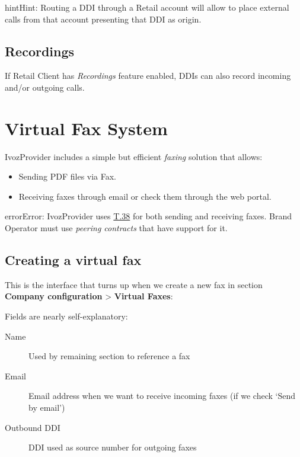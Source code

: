 \documentclass[letterpaper,10pt,english]{sphinxmanual}
\begin{document}
\begin{notice}{hint}{Hint:}
Routing a DDI through a Retail account will allow to place external calls
from that account presenting that DDI as origin.
\end{notice}


\subsection{Recordings}
\label{retail/retail_ddis:recordings}
If Retail Client has \emph{Recordings} feature enabled, DDIs can also record incoming and/or
outgoing calls.


\section{Virtual Fax System}
\label{faxing/index:virtual-fax-system}\label{faxing/index::doc}\label{faxing/index:faxing-system}
IvozProvider includes a simple but efficient \emph{faxing} solution that allows:
\begin{itemize}
\item {} 
Sending PDF files via Fax.

\item {} 
Receiving faxes through email or check them through the web portal.

\end{itemize}

\begin{notice}{error}{Error:}
IvozProvider uses
\href{http://www.voip-info.org/wiki/view/T.38}{T.38} for both sending and receiving
faxes. Brand Operator must use \emph{peering contracts} that have support for it.
\end{notice}


\subsection{Creating a virtual fax}
\label{faxing/index:creating-a-virtual-fax}
This is the interface that turns up when we create a new fax in section
\textbf{Company configuration} \textgreater{} \textbf{Virtual Faxes}:


Fields are nearly self-explanatory:
\begin{description}
\item[{Name}] \leavevmode{}\label{faxing/index:term-name}
Used by remaining section to reference a fax

\item[{Email}] \leavevmode{}\label{faxing/index:term-email}
Email address when we want to receive incoming faxes (if we check `Send
by email')

\item[{Outbound DDI}] \leavevmode{}\label{faxing/index:term-outbound-ddi}
DDI used as source number for outgoing faxes

\end{description}
\end{document}
